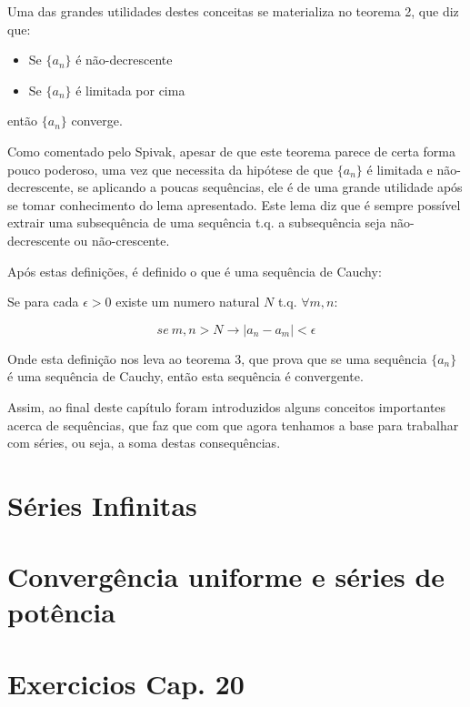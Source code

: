 \documentclass[a4paper, 12pt]{article}
\begin{document}
Uma das grandes utilidades destes conceitas se materializa no teorema 2, que diz que:

\begin{itemize}
	\item Se $\{a_n\}$ é não-decrescente
	\item Se $\{a_n\}$ é limitada por cima
\end{itemize}

então $\{a_n\}$ converge.

Como comentado pelo Spivak, apesar de que este teorema parece de certa forma pouco poderoso,
uma vez que necessita da hipótese de que $\{a_n\}$ é limitada e não-decrescente, se
aplicando a poucas sequências, ele é de uma grande utilidade após se tomar conhecimento
do lema apresentado. Este lema diz que é sempre possível extrair uma subsequência de 
uma sequência t.q. a subsequência seja não-decrescente ou não-crescente.

Após estas definições, é definido o que é uma sequência de Cauchy:

Se para cada $\epsilon > 0$ existe um numero natural $N$ t.q. $\forall m,n$:

\begin{equation}
	se\  m,n > N \to |a_n - a_m| < \epsilon
\end{equation}

Onde esta definição nos leva ao teorema 3, que prova que se uma sequência $\{a_n\}$ é uma 
sequência de Cauchy, então esta sequência é convergente.

Assim, ao final deste capítulo foram introduzidos alguns conceitos importantes acerca 
de sequências, que faz que com que agora tenhamos a base para trabalhar com séries,
ou seja, a soma destas consequências.

\newpage


\section{Séries Infinitas}






\newpage
\section{Convergência uniforme e séries de potência}

\newpage

\section{Exercicios Cap. 20}
\end{document}
